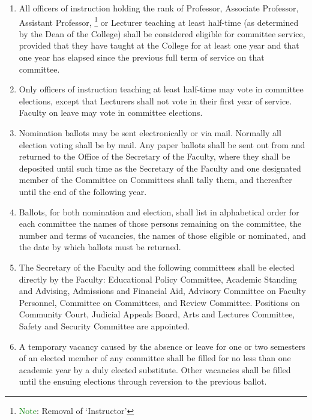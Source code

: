 \documentclass{manual}
\newcommand{\editRemark}[3]{\textcolor{green}{#2}\footnote{\textcolor{green}{#1}: #3}}
\newcommand{\editNote}[1]{\editRemark{Note}{}{#1}}
\newcommand{\editRemove}[1]{}
\newcommand{\itemLevelA}{\alph*.}
\newcommand{\itemRefA}{\alph*}
\begin{document}
\begin{enumerate}[label=\itemLevelA,ref=\itemRefA]
\item All officers of instruction holding the rank of Professor, Associate Professor, Assistant Professor, \editRemove{Instructor}\editNote{Removal of `Instructor'} or Lecturer teaching at least half-time (as determined by the Dean of the College) shall be considered eligible for committee service, provided that they have taught at the College for at least one year and that one year has elapsed since the previous full term of service on that committee.
\item Only officers of instruction teaching at least half-time may vote in committee elections, except that Lecturers shall not vote in their first year of service. Faculty on leave may vote in committee elections.
\item Nomination ballots may be sent electronically or via mail. Normally all election voting shall be by mail. Any paper ballots shall be sent out from and returned to the Office of the Secretary of the Faculty, where they shall be deposited until such time as the Secretary of the Faculty and one designated member of the Committee on Committees shall tally them, and thereafter until the end of the following year.
\item \label{item:ballots05} Ballots, for both nomination and election, shall list in alphabetical order for each committee the names of those persons remaining on the committee, the number and terms of vacancies, the names of those eligible or nominated, and the date by which ballots must be returned.
\item The Secretary of the Faculty and the following committees shall be elected directly by the Faculty: Educational Policy Committee, Academic Standing and Advising, Admissions and Financial Aid, Advisory Committee on Faculty Personnel, Committee on Committees, and Review Committee. Positions on Community Court, Judicial Appeals Board, Arts and Lectures Committee, Safety and Security Committee are appointed.
\item A temporary vacancy caused by the absence or leave for one or two semesters of an elected member of any committee shall be filled for no less than one academic year by a duly elected substitute. Other vacancies shall be filled until the ensuing elections through reversion to the previous ballot.
\end{enumerate}

\end{document}
